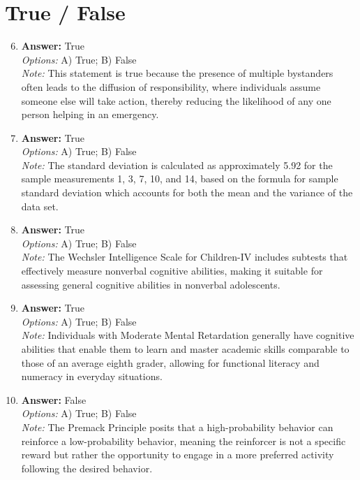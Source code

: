 \documentclass[12pt]{article}
\begin{document}
\section*{True / False}
\begin{enumerate}[label=\arabic*.]
\setcounter{enumi}{5}
\item \textbf{Answer:} True
\\ \textit{Options:} A) True; B) False
\\ \textit{Note:} This statement is true because the presence of multiple bystanders often leads to the diffusion of responsibility, where individuals assume someone else will take action, thereby reducing the likelihood of any one person helping in an emergency.
\item \textbf{Answer:} True
\\ \textit{Options:} A) True; B) False
\\ \textit{Note:} The standard deviation is calculated as approximately 5.92 for the sample measurements 1, 3, 7, 10, and 14, based on the formula for sample standard deviation which accounts for both the mean and the variance of the data set.
\item \textbf{Answer:} True
\\ \textit{Options:} A) True; B) False
\\ \textit{Note:} The Wechsler Intelligence Scale for Children-IV includes subtests that effectively measure nonverbal cognitive abilities, making it suitable for assessing general cognitive abilities in nonverbal adolescents.
\item \textbf{Answer:} True
\\ \textit{Options:} A) True; B) False
\\ \textit{Note:} Individuals with Moderate Mental Retardation generally have cognitive abilities that enable them to learn and master academic skills comparable to those of an average eighth grader, allowing for functional literacy and numeracy in everyday situations.
\item \textbf{Answer:} False
\\ \textit{Options:} A) True; B) False
\\ \textit{Note:} The Premack Principle posits that a high-probability behavior can reinforce a low-probability behavior, meaning the reinforcer is not a specific reward but rather the opportunity to engage in a more preferred activity following the desired behavior.
\end{enumerate}
\end{document}
